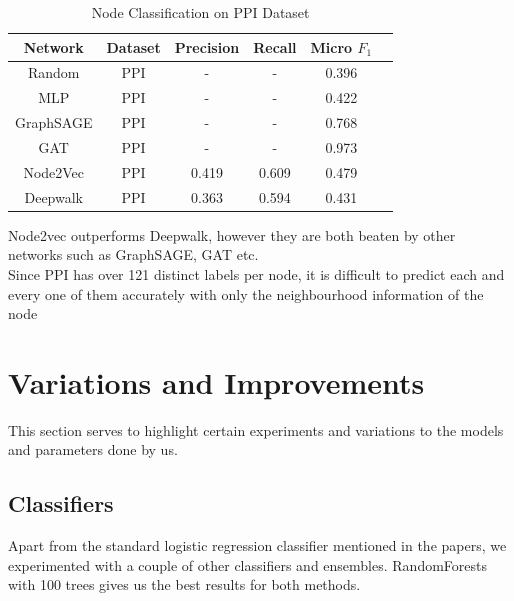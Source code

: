 \documentclass[sigconf]{acmart}
\begin{document}
\begin{table}[h]
\begin{center}
\begin{tabular}{ c|c|c|c|c|c } 
 \textbf{Network} & \textbf{Dataset} & \textbf{Precision} & \textbf{Recall} & \textbf{Micro $F_{1}$} \\ 
 \hline
 Random & PPI & - & - & 0.396 \\
 MLP & PPI & - & - & 0.422 \\
 GraphSAGE\cite{hamilton2017inductive} & PPI & - & - & 0.768 \\
 GAT\cite{velivckovic2017graph} & PPI & - & - & 0.973 \\
 \hline
 Node2Vec\cite{node2vec-kdd2016} & PPI & 0.419 & 0.609 & 0.479  \\ 
 Deepwalk\cite{Perozzi:2014:DOL:2623330.2623732} & PPI & 0.363 & 0.594 & 0.431

\end{tabular}
\end{center}
\caption{Node Classification on PPI Dataset}
\label{tab:res3}
\end{table}

Node2vec outperforms Deepwalk, however they are both beaten by other networks such as GraphSAGE, GAT etc. \\
Since PPI has over 121 distinct labels per node, it is difficult to predict each and every one of them accurately with only the neighbourhood information of the node \\
\newpage

\section{Variations and Improvements}
This section serves to highlight certain experiments and variations to the models and parameters done by us.
\subsection{Classifiers}

Apart from the standard logistic regression classifier mentioned in the papers, we experimented with a couple of other classifiers and ensembles. RandomForests with 100 trees gives us the best results for both methods.
\end{document}
